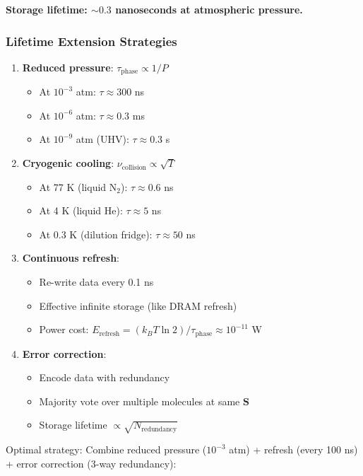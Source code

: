 \textbf{Storage lifetime: $\sim 0.3$ nanoseconds at atmospheric pressure.}

\subsubsection{Lifetime Extension Strategies}

\begin{enumerate}
\item \textbf{Reduced pressure}: $\tau_{\text{phase}} \propto 1/P$
\begin{itemize}
\item At $10^{-3}$ atm: $\tau \approx 300$ ns
\item At $10^{-6}$ atm: $\tau \approx 0.3$ ms
\item At $10^{-9}$ atm (UHV): $\tau \approx 0.3$ s
\end{itemize}

\item \textbf{Cryogenic cooling}: $\nu_{\text{collision}} \propto \sqrt{T}$
\begin{itemize}
\item At 77 K (liquid N$_2$): $\tau \approx 0.6$ ns
\item At 4 K (liquid He): $\tau \approx 5$ ns
\item At 0.3 K (dilution fridge): $\tau \approx 50$ ns
\end{itemize}

\item \textbf{Continuous refresh}:
\begin{itemize}
\item Re-write data every 0.1 ns
\item Effective infinite storage (like DRAM refresh)
\item Power cost: $E_{\text{refresh}} = (k_B T \ln 2)/\tau_{\text{phase}} \approx 10^{-11}$ W
\end{itemize}

\item \textbf{Error correction}:
\begin{itemize}
\item Encode data with redundancy
\item Majority vote over multiple molecules at same $\mathbf{S}$
\item Storage lifetime $\propto \sqrt{N_{\text{redundancy}}}$
\end{itemize}
\end{enumerate}

Optimal strategy: Combine reduced pressure ($10^{-3}$ atm) + refresh (every 100 ns) + error correction (3-way redundancy):

